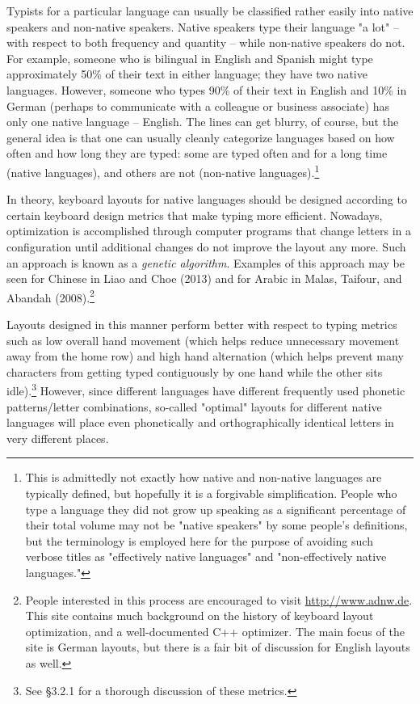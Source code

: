 \documentclass[11pt]{article}
\begin{document}
Typists for a particular language can usually be classified rather easily into native speakers and non-native speakers. Native speakers type their language "a lot" -- with respect to both frequency and quantity -- while non-native speakers do not. For example, someone who is bilingual in English and Spanish might type approximately 50\% of their text in either language; they have two native languages. However, someone who types 90\% of their text in English and 10\% in German (perhaps to communicate with a colleague or business associate) has only one native language -- English. The lines can get blurry, of course, but the general idea is that one can usually cleanly categorize languages based on how often and how long they are typed: some are typed often and for a long time (native languages), and others are not (non-native languages).\footnote{This is admittedly not exactly how native and non-native languages are typically defined, but hopefully it is a forgivable simplification. People who type a language they did not grow up speaking as a significant percentage of their total volume may not be "native speakers" by some people's definitions, but the terminology is employed here for the purpose of avoiding such verbose titles as "effectively native languages" and "non-effectively native languages."}

In theory, keyboard layouts for native languages should be designed according to certain keyboard design metrics that make typing more efficient. Nowadays, optimization is accomplished through computer programs that change letters in a configuration until additional changes do not improve the layout any more. Such an approach is known as a \emph{genetic algorithm}. Examples of this approach may be seen for Chinese in Liao and Choe (2013) and for Arabic in Malas, Taifour, and Abandah (2008).\footnote{People interested in this process are encouraged to visit \url{http://www.adnw.de}. This site contains much background on the history of keyboard layout optimization, and a well-documented C++ optimizer. The main focus of the site is German layouts, but there is a fair bit of discussion for English layouts as well.}

Layouts designed in this manner perform better with respect to typing metrics such as low overall hand movement (which helps reduce unnecessary movement away from the home row) and high hand alternation (which helps prevent many characters from getting typed contiguously by one hand while the other sits idle).\footnote{See §3.2.1 for a thorough discussion of these metrics.} However, since different languages have different frequently used phonetic patterns/letter combinations, so-called "optimal" layouts for different native languages will place even phonetically and orthographically identical letters in very different places.
\end{document}
